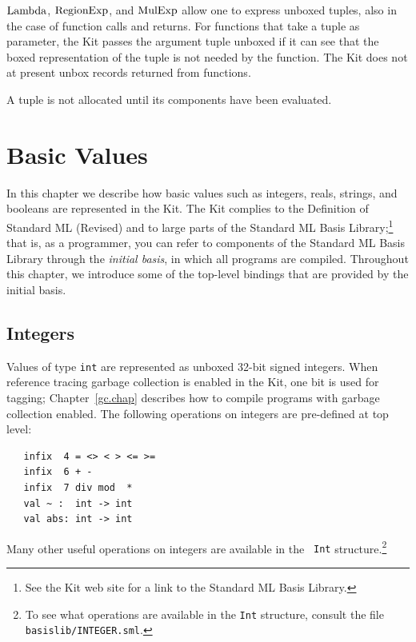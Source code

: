 \documentclass[12pt]{book}
\begin{document}
$\hbox{\rm Lambda}$, $\hbox{\rm RegionExp}$, and $\hbox{\rm MulExp}$ allow one to express unboxed tuples,
also in the case of function calls and returns. For functions that
take a tuple as parameter, the Kit passes the argument tuple unboxed
%
%
if it can see that the boxed representation of the tuple is not needed
by the function. The Kit does not at present unbox records returned
from functions.

A tuple is not allocated until its components have been evaluated.

\chapter{Basic Values}
In this chapter we describe how basic values such as integers, reals,
strings, and booleans are represented in the Kit. The Kit complies to
the Definition of Standard ML (Revised)
%
and to large parts of the Standard ML Basis
Library;\footnote{See the Kit web site for a link to the Standard ML
  Basis Library.}
%
that is, as a programmer, you can refer to components of the Standard
ML Basis Library through the
%
{\em initial basis}, in which all programs are compiled.  Throughout
this chapter, we introduce some of the top-level bindings that are
provided by the initial basis.

\section{Integers}
\label{integers.sec}
Values of type 
%
{\tt int} are represented as unboxed 32-bit signed integers. When reference
tracing garbage collection is enabled in the Kit, one bit is used for
tagging; Chapter~\ref{gc.chap} describes how to compile programs with
garbage collection enabled.  The following operations on integers are
pre-defined at top level:
%
%
%
%
%
%
%
%
%
%
%
%
%
\begin{verbatim}
   infix  4 = <> < > <= >= 
   infix  6 + - 
   infix  7 div mod  * 
   val ~ :  int -> int
   val abs: int -> int
\end{verbatim}
Many other useful operations on integers are available in the {\tt
  Int} structure.\footnote{To see what operations are available in the
  {\tt Int} structure, consult the file {\tt
    basislib/INTEGER.sml}.}
\end{document}
